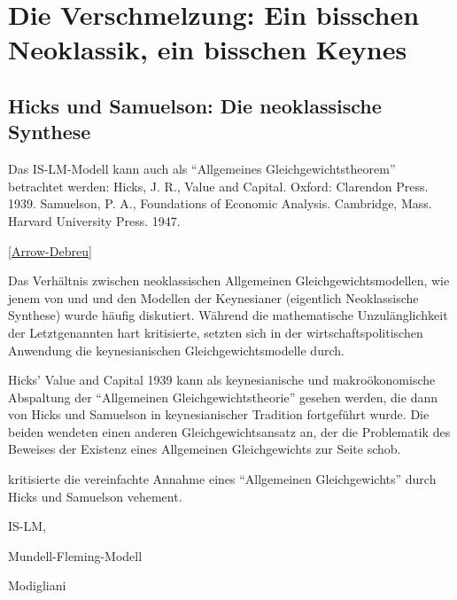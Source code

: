 %
%
%

\chapter{Die Verschmelzung: Ein bisschen Neoklassik, ein bisschen Keynes}
\label{Synthese}

\section{Hicks und Samuelson: Die neoklassische Synthese}



Das IS-LM-Modell kann auch als "`Allgemeines Gleichgewichtstheorem"' betrachtet werden:
Hicks, J. R., Value and Capital. Oxford: Clarendon Press. 1939.
Samuelson, P. A., Foundations of Economic Analysis. Cambridge, Mass. Harvard University Press. 1947.

\ref{Arrow-Debreu}

Das Verhältnis zwischen neoklassischen Allgemeinen Gleichgewichtsmodellen, wie jenem von \textcite{Arrow1954} und \textcite{McKenzie1954} und den Modellen der Keynesianer (eigentlich Neoklassische Synthese) \textcite{Hicks1939} wurde häufig diskutiert. Während \textcite{Morgenstern1941} die mathematische Unzulänglichkeit der Letztgenannten hart kritisierte, setzten sich in der wirtschaftspolitischen Anwendung die keynesianischen Gleichgewichtsmodelle durch.



Hicks' Value and Capital 1939 \parencite[S. 20]{Weintraub1983} kann als keynesianische und makroökonomische Abspaltung der "`Allgemeinen Gleichgewichtstheorie"' gesehen werden, die dann von Hicks und Samuelson in keynesianischer Tradition fortgeführt wurde. 
Die beiden wendeten einen anderen Gleichgewichtsansatz an, der die Problematik des Beweises der Existenz eines Allgemeinen Gleichgewichts zur Seite schob.\parencite[S. 21]{Weintraub1983}

\textcite{Morgenstern1941} kritisierte die vereinfachte Annahme eines "`Allgemeinen Gleichgewichts"' durch Hicks und Samuelson vehement. 

IS-LM, 


Mundell-Fleming-Modell


Modigliani

